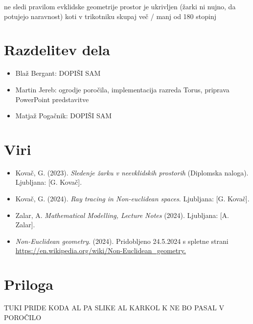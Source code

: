 \documentclass[titlepage]{article}
\begin{document}
ne sledi pravilom evklidske geometrije
prostor je ukrivljen (žarki ni nujno, da potujejo naravnost)
koti v trikotniku skupaj več / manj od  180 stopinj


\section{Razdelitev dela}
\begin{itemize}
  \item Blaž Bergant: DOPIŠI SAM
  \item Martin Jereb: ogrodje poročila, implementacija razreda Torus, priprava PowerPoint predstavitve
  \item Matjaž Pogačnik: DOPIŠI SAM 
\end{itemize}


\section{Viri}
\begin{itemize}
  \item Kovač, G. (2023). \textit{Sledenje žarku v neevklidskih
prostorih} (Diplomska naloga). Ljubljana: [G. Kovač].
  \item Kovač, G. (2024). \textit{Ray tracing in Non-euclidean spaces}. Ljubljana: [G. Kovač].
  \item Zalar, A. \textit{Mathematical Modelling, Lecture Notes} (2024). Ljubljana: [A. Zalar].
    \item \textit{Non-Euclidean geometry}. (2024). Pridobljeno 24.5.2024 s spletne strani \url{https://en.wikipedia.org/wiki/Non-Euclidean_geometry.}
\end{itemize}

\section{Priloga}
TUKI PRIDE KODA AL PA SLIKE AL KARKOL K NE BO PASAL V POROČILO
\end{document}
